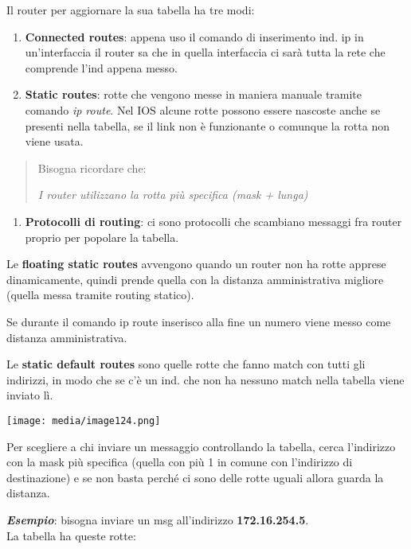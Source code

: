 Il router per aggiornare la sua tabella ha tre modi:

\begin{enumerate}
\def\labelenumi{\arabic{enumi}.}
\item
  \textbf{Connected routes}: appena uso il comando di inserimento ind.
  ip in un'interfaccia il router sa che in quella interfaccia ci sarà
  tutta la rete che comprende l'ind appena messo.
\item
  \textbf{Static routes}: rotte che vengono messe in maniera manuale
  tramite comando \emph{ip route}. Nel IOS alcune rotte possono essere
  nascoste anche se presenti nella tabella, se il link non è funzionante
  o comunque la rotta non viene usata.
\end{enumerate}

\begin{quote}
Bisogna ricordare che:

\emph{I router utilizzano la rotta più specifica (mask + lunga)}
\end{quote}

\begin{enumerate}
\def\labelenumi{\arabic{enumi}.}
\setcounter{enumi}{2}
\item
  \textbf{Protocolli di routing}: ci sono protocolli che scambiano
  messaggi fra router proprio per popolare la tabella.
\end{enumerate}

Le \textbf{floating static routes} avvengono quando un router non ha
rotte apprese dinamicamente, quindi prende quella con la distanza
amministrativa migliore (quella messa tramite routing statico).

Se durante il comando ip route inserisco alla fine un numero viene messo
come distanza amministrativa.

Le \textbf{static default routes} sono quelle rotte che fanno match con
tutti gli indirizzi, in modo che se c'è un ind. che non ha nessuno match
nella tabella viene inviato lì.

\texttt{[image: media/image124.png]}

Per scegliere a chi inviare un messaggio controllando la tabella, cerca
l'indirizzo con la mask più specifica (quella con più 1 in comune con
l'indirizzo di destinazione) e se non basta perché ci sono delle rotte
uguali allora guarda la distanza.

\emph{\textbf{Esempio}}: bisogna inviare un msg all'indirizzo
\textbf{172.16.254.5}.\\
La tabella ha queste rotte:

